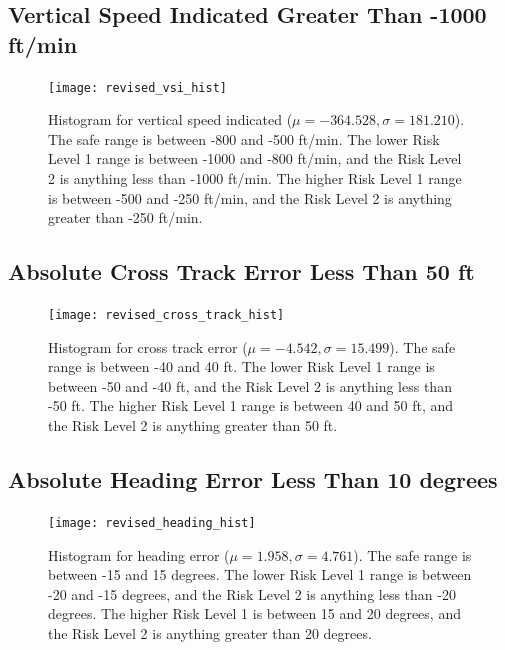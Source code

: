     \subsection{Vertical Speed Indicated Greater Than -1000 ft/min}

		\begin{figure}
			\centering
            \texttt{[image: revised\_vsi\_hist]}
            \caption{Histogram for vertical speed indicated ($\mu = -364.528, \sigma = 181.210$).  The safe range is between -800 and -500 ft/min.  The lower Risk Level 1 range is between -1000 and -800 ft/min, and the Risk Level 2 is anything less than -1000 ft/min.  The higher Risk Level 1 range is between -500 and -250 ft/min, and the Risk Level 2 is anything greater than -250 ft/min.}
            \label{fig:revised_vsi_hist}
		\end{figure}



    \subsection{Absolute Cross Track Error Less Than 50 ft}

		\begin{figure}
			\centering
            \texttt{[image: revised\_cross\_track\_hist]}
            \caption{Histogram for cross track error ($\mu = -4.542, \sigma = 15.499$).  The safe range is between -40 and 40 ft.  The lower Risk Level 1 range is between -50 and -40 ft, and the Risk Level 2 is anything less than -50 ft.  The higher Risk Level 1 range is between 40 and 50 ft, and the Risk Level 2 is anything greater than 50 ft.}
            \label{fig:revised_cross_track_hist}
		\end{figure}



    \subsection{Absolute Heading Error Less Than 10 degrees}
        
        \begin{figure}
			\centering
            \texttt{[image: revised\_heading\_hist]}
            \caption{Histogram for heading error ($\mu = 1.958, \sigma = 4.761$).  The safe range is between -15 and 15 degrees.  The lower Risk Level 1 range is between -20 and -15 degrees, and the Risk Level 2 is anything less than -20 degrees.  The higher Risk Level 1 is between 15 and 20 degrees, and the Risk Level 2 is anything greater than 20 degrees.}
            \label{fig:revised_heading_hist}
		\end{figure}
            

